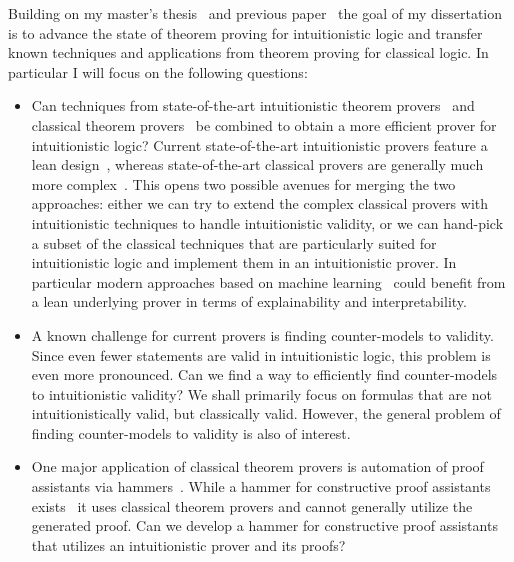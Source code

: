 \documentclass{article}
\theoremstyle{definition}
\theoremstyle{definition}
\theoremstyle{definition}
\theoremstyle{definition}
\theoremstyle{definition}
\theoremstyle{definition}
\theoremstyle{definition}
\newcommand{\0}{\mathbf 0}
\newcommand{\1}{\mathbf 1}
\begin{document}
	Building on my master's thesis~\cite{thesis} and previous paper~\cite{pluska2023embedding} the goal of my dissertation is to advance the state of theorem proving for intuitionistic logic and transfer known techniques and applications from theorem proving for classical logic. In particular I will focus on the following questions:
	\begin{itemize}
		\item Can techniques from state-of-the-art intuitionistic theorem provers~\cite{otten2008leancop,otten2021nanocop} and classical theorem provers~\cite{kovacs2013first,schulz2002brainiac} be combined to obtain a more efficient prover for intuitionistic logic? Current state-of-the-art intuitionistic provers feature a lean design~\cite{otten2008leancop,otten2021nanocop}, whereas state-of-the-art classical provers are generally much more complex~\cite{kovacs2013first}. This opens two possible avenues for merging the two approaches: either we can try to extend the complex classical provers with intuitionistic techniques to handle intuitionistic validity, or we can hand-pick a subset of the classical techniques that are particularly suited for intuitionistic logic and implement them in an intuitionistic prover. In particular modern approaches based on machine learning~\cite{kaliszyk2018reinforcement,loos2017deep,rawson2019neurally} could benefit from a lean underlying prover in terms of explainability and interpretability.
		\item A known challenge for current provers is finding counter-models to validity. Since even fewer statements are valid in intuitionistic logic, this problem is even more pronounced. Can we find a way to efficiently find counter-models to intuitionistic validity? We shall primarily focus on formulas that are not intuitionistically valid, but classically valid. However, the general problem of finding counter-models to validity is also of interest.
		\item One major application of classical theorem provers is automation of proof assistants via hammers~\cite{bohme2010sledgehammer}. While a hammer for constructive proof assistants exists~\cite{czajka2018hammer} it uses classical theorem provers and cannot generally utilize the generated proof. Can we develop a hammer for constructive proof assistants that utilizes an intuitionistic prover and its proofs?
	\end{itemize}
	


	
	
	
\end{document}
